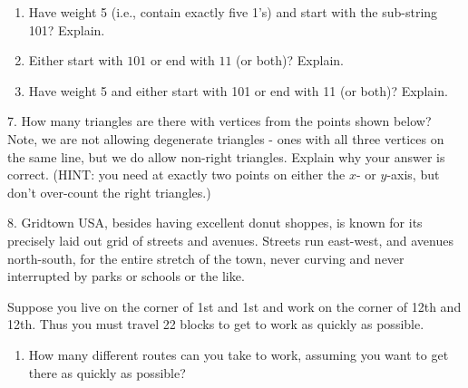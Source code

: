 \documentclass[10pt,]{book}
\theoremstyle{plain}
\theoremstyle{definition}
\theoremstyle{definition}
\theoremstyle{definition}
\numberwithin{equation}{chapter}
\begin{document}
\begin{exerciselist}
\begin{enumerate}[label=(\alph*)]
\item\hypertarget{li-785}{}
                Have weight 5 (i.e., contain exactly five 1's) and start with the sub-string 101? Explain.


\item\hypertarget{li-786}{}
                Either start with \(101\) or end with \(11\) (or both)? Explain.


\item\hypertarget{li-787}{}
                Have weight 5 and either start with 101 or end with 11 (or both)? Explain.


\end{enumerate}
\par\smallskip
\item[7.]\hypertarget{exercise-130}{}
            How many triangles are there with vertices from the points shown below? Note, we are not allowing degenerate triangles - ones with all three vertices on the same line, but we do allow non-right triangles. Explain why your answer is correct. (HINT: you need at exactly two points on either the \(x\)- or \(y\)-axis, but don't over-count the right triangles.)
\leavevmode%
\begin{figure}
\centering
{
}
\end{figure}
\par\smallskip
\item[8.]\hypertarget{exercise-131}{}
            Gridtown USA, besides having excellent donut shoppes, is known for its precisely laid out grid of streets and avenues. Streets run east-west, and avenues north-south, for the entire stretch of the town, never curving and never interrupted by parks or schools or the like.
\par

            Suppose you live on the corner of 1st and 1st and work on the corner of 12th and 12th. Thus you must travel 22 blocks to get to work as quickly as possible.
\leavevmode%
\begin{enumerate}[label=(\alph*)]
\item\hypertarget{li-788}{}
                How many different routes can you take to work, assuming you want to get there as quickly as possible?



\end{enumerate}
\end{exerciselist}
\end{document}
